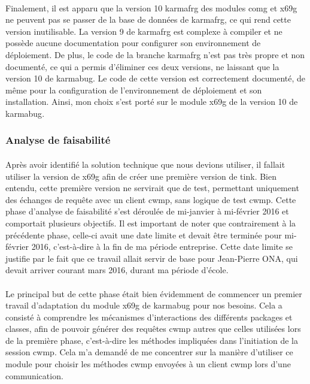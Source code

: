 \documentclass[12pt,a4paper]{report}
\begin{document}
\paragraph*{} Finalement, il est apparu que la version 10 \gls{karmafrg} des modules \gls{comg} et \gls{x69g} ne peuvent pas se passer de la base de données de \gls{karmafrg}, ce qui rend cette version inutilisable. La version 9 de \gls{karmafrg} est complexe à compiler et ne possède aucune documentation pour configurer son environnement de déploiement. De plus, le code de la branche \gls{karmafrg} n’est pas très propre et non documenté, ce qui a permis d’éliminer ces deux versions, ne laissant que la version 10 de \gls{karmabug}. Le code de cette version est correctement documenté, de même pour la configuration de l’environnement de déploiement et son installation. Ainsi, mon choix s’est porté sur le module \gls{x69g} de la version 10 de \gls{karmabug}. \\
\subsubsection{Analyse de faisabilité}
\paragraph*{}Après avoir identifié la solution technique que nous devions utiliser, il
fallait utiliser la version de \gls{x69g} afin de créer une première version de \gls{tink}. Bien entendu, cette première version ne servirait que de test, permettant uniquement des échanges de requête avec un client \gls{cwmp}, sans logique de test \gls{cwmp}. Cette phase d’analyse de faisabilité s’est déroulée de mi-janvier à mi-février 2016 et comportait plusieurs objectifs. Il est important de noter que contrairement à la précédente phase, celle-ci avait une date limite et devait être terminée pour mi-février 2016, c’est-à-dire à la fin de ma période entreprise. Cette date limite se justifie par le fait que ce travail allait servir de base pour Jean-Pierre ONA, qui devait arriver courant mars 2016, durant ma période d’école.
\paragraph*{}Le principal but de cette phase était bien évidemment de commencer un
premier travail d’adaptation du module \gls{x69g} de \gls{karmabug} pour nos besoins. Cela a consisté à comprendre les mécanismes d’interactions des différents packages et classes, afin de pouvoir générer des requêtes \gls{cwmp} autres que celles utilisées lors de la première phase, c’est-à-dire les méthodes impliquées dans l’initiation de la session \gls{cwmp}. Cela m’a demandé de me concentrer sur la manière d’utiliser ce module pour choisir les méthodes \gls{cwmp} envoyées à un client \gls{cwmp} lors d’une communication.
\end{document}
